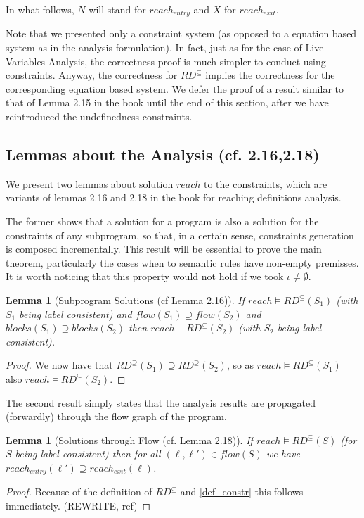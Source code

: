 \documentclass[a4wide,12pt]{article}
\theoremstyle{definition}
\theoremstyle{plain}
\newtheorem{lemma}[theo]{Lemma}
\theoremstyle{remark}
\begin{document}
In what follows, $N$ will stand for $reach_{entry}$ and $X$ for $reach_{exit}$. 


Note that we presented only a constraint system (as opposed to a equation based system 
as in the analysis formulation). In fact, just as for the case of Live Variables Analysis,
the correctness proof is much simpler to conduct using constraints. Anyway,
the correctness for $RD^\subseteq$ implies the correctness for the corresponding
equation based system. We defer the proof of a result similar to that of Lemma 2.15 in the book
until the end of this section, after we have reintroduced the undefinedness constraints.


\subsection*{Lemmas about the Analysis (cf. 2.16,2.18)}

We present two lemmas about solution $reach$ to the constraints, which are variants
of lemmas 2.16 and 2.18 in the book for reaching definitions analysis.

The former 
shows that a solution for a program is also a solution for the constraints of any
subprogram, so that, in a certain sense, constraints generation is composed incrementally.
This result will be essential to prove the main theorem, particularly the cases when
to semantic rules have non-empty premisses. 
It is worth noticing that this property would not hold if we took $\iota \neq \emptyset$.

\begin{lemma}[Subprogram Solutions (cf Lemma 2.16)]
If $reach \models RD^\subseteq(S_1)$ (with $S_1$ being label consistent) and
$flow(S_1) \supseteq flow(S_2)$ and $blocks(S_1) \supseteq blocks(S_2)$ then
$reach \models RD^\subseteq(S_2)$ (with $S_2$ being label consistent).
\end{lemma}
\begin{proof}
We now have that $RD^{\supseteq}(S_1) \supseteq RD^{\supseteq}(S_2)$, so as
$reach \models RD^\subseteq(S_1)$ also $reach \models RD^\subseteq(S_2)$.
\end{proof}


The second result simply states that the analysis results are
propagated (forwardly) through the flow graph of the program.

\begin{lemma}[Solutions through Flow (cf. Lemma 2.18)]
\label{lem218}
If $reach \models RD^\subseteq(S)$ (for $S$ being label consistent) then for all
$(\ell, \ell') \in flow(S)$ we have $reach_{entry}(\ell') \supseteq reach_{exit}(\ell)$.
\end{lemma}
\begin{proof}
Because of the definition of $RD^\subseteq$ and \ref{def_constr} this follows
immediately.
(REWRITE, ref)
\end{proof}
\end{document}
